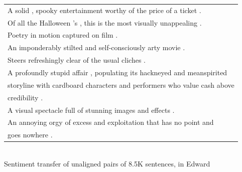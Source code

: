 \documentclass[10pt,
               xcolor={usenames,dvipsnames},
               hyperref={colorlinks,linktoc=all,citecolor=Plum,linkcolor=MidnightBlue,urlcolor=MidnightBlue},noamssymb]{beamer}
\begin{document}
\begin{frame}[plain,t]
\vspace{8ex}
\begin{center}
\begin{tabular}{@{~~~~~}l@{~~~~~}}
\toprule
A solid , spooky entertainment worthy of the price of a ticket . \\
Of all the Halloween 's , this is the most visually unappealing . \\[2ex]

Poetry in motion captured on film . \\
An imponderably stilted and self-consciously arty movie . \\[2ex]

Steers refreshingly clear of the usual cliches . \\
A profoundly stupid affair , populating its hackneyed and meanspirited
\\\quad
storyline with cardboard characters and performers who value cash
above\\\quad
credibility . \\[2ex]

A visual spectacle full of stunning images and effects . \\
An annoying orgy of excess and exploitation that has no point
and\\\quad goes nowhere . \\
\bottomrule
\end{tabular}
\\[5ex]
Sentiment transfer of unaligned pairs of 8.5K sentences, in Edward
\end{center}
\end{frame}
\end{document}
